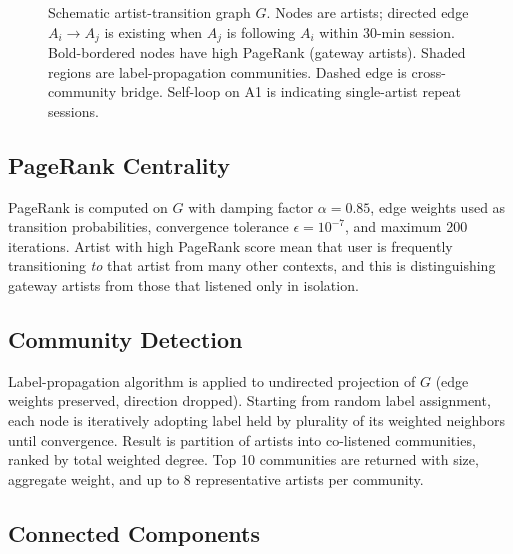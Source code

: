 \documentclass[conference]{IEEEtran}
\begin{document}
\begin{figure}[ht]
\caption{Schematic artist-transition graph $G$. Nodes are artists;
directed edge $A_i \to A_j$ is existing when $A_j$ is following $A_i$
within 30-min session. Bold-bordered nodes have high PageRank (gateway
artists). Shaded regions are label-propagation communities. Dashed edge
is cross-community bridge. Self-loop on A1 is indicating single-artist
repeat sessions.}
\label{fig:graph}
\end{figure}

\subsection{PageRank Centrality}

PageRank \cite{page1999pagerank} is computed on $G$ with damping factor $\alpha = 0.85$, edge weights used as transition probabilities, convergence tolerance $\epsilon = 10^{-7}$, and maximum 200 iterations. Artist with high PageRank score mean that user is frequently transitioning \emph{to} that artist from many other contexts, and this is distinguishing gateway artists from those that listened only in isolation.

\subsection{Community Detection}

Label-propagation algorithm \cite{raghavan2007near} is applied to undirected projection of $G$ (edge weights preserved, direction dropped). Starting from random label assignment, each node is iteratively adopting label held by plurality of its weighted neighbors until convergence. Result is partition of artists into co-listened communities, ranked by total weighted degree. Top 10 communities are returned with size, aggregate weight, and up to 8 representative artists per community.

\subsection{Connected Components}
\end{document}
